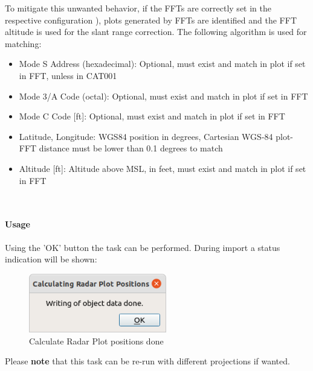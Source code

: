 To mitigate this unwanted behavior, if the FFTs are correctly set in the respective configuration ), plots generated by FFTs are identified and the FFT altitude is used for the slant range correction. The following algorithm is used for matching:

\begin{itemize}
\item Mode S Address (hexadecimal): Optional, must exist and match in plot if set in FFT, unless in CAT001
\item Mode 3/A Code (octal): Optional, must exist and match in plot if set in FFT
\item Mode C Code [ft]: Optional, must exist and match in plot if set in FFT
\item Latitude, Longitude: WGS84 position in degrees, Cartesian WGS-84 plot-FFT distance must be lower than 0.1 degrees to match
\item Altitude [ft]: Altitude above MSL, in feet, must exist and match in plot if set in FFT
\end{itemize}
\ \\

\paragraph{Usage}

Using the 'OK' button the task can be performed. During import a status indication will be shown:

\begin{figure}[H]
  \center
    \includegraphics[width=6cm]{figures/proc_calc_radar_done.png}
  \caption{Calculate Radar Plot positions done}
\end{figure}

Please \textbf{note} that this task can be re-run with different projections if wanted.

